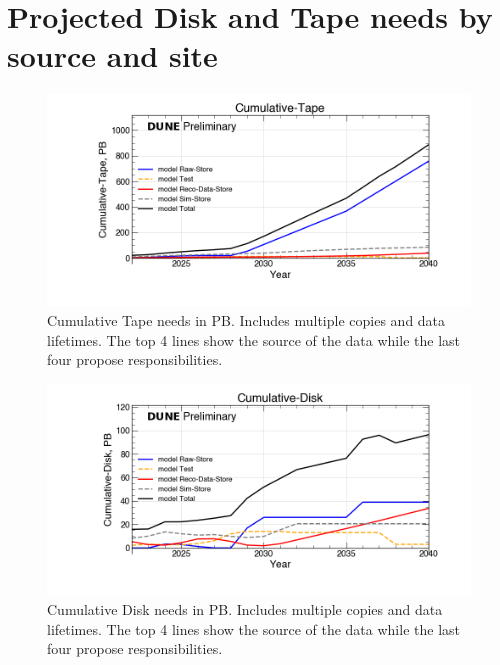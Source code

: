 \section{Projected Disk and Tape needs by source and site}
\begin{figure}[h]
\centering\includegraphics[height=0.4\textwidth]{NearTerm_2024-02-05-2040_noMWC/NearTerm_2024-02-05-2040_noMWC-Cumulative-Tape.png}
\caption{Cumulative Tape needs in PB. Includes multiple copies and data lifetimes. The top 4 lines show the source of the data while the last four propose responsibilities.}
\label{fig:Cumulative-Tape}
\end{figure}
\begin{figure}[h]
\centering\includegraphics[height=0.4\textwidth]{NearTerm_2024-02-05-2040_noMWC/NearTerm_2024-02-05-2040_noMWC-Cumulative-Disk.png}
\caption{Cumulative Disk needs in PB. Includes multiple copies and data lifetimes. The top 4 lines show the source of the data while the last four propose responsibilities.}
\label{fig:Cumulative-Disk}
\end{figure}
